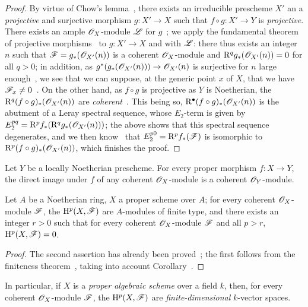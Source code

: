 \begin{proof}
By virtue of Chow's lemma~, there exists an irreducible prescheme $X'$ an a \emph{projective} and surjective morphism $g:X'\to X$ such that $f\circ g:X'\to Y$ is \emph{projective}.
There exists an ample $\mathscr{O}_X$-module $\mathscr{L}$ for $g$~; we apply the fundamental theorem of projective morphisms~ to $g:X'\to X$ and with $\mathscr{L}$: there thus exists an integer $n$ such that $\mathscr{F}=g_*(\mathscr{O}_{X'}(n))$ is a coherent $\mathscr{O}_X$-module and $\mathrm{R}^q g_*(\mathscr{O}_{X'}(n))=0$ for all $q>0$; in addition, as $g^*(g_*(\sh{O}_{X'}(n)))\to\sh{O}_{X'}(n)$ is surjective for $n$ large enough~, we see that we can suppose, at the generic point $x$ of $X$, that we have $\mathscr{F}_x\neq 0$~.
On the other hand, as $f\circ g$ is projective as $Y$ is Noetherian, the $\mathrm{R}^q(f\circ g)_*(\mathscr{O}_{X'}(n))$ are \emph{coherent}~.
This being so, $\mathrm{R}^\bullet(f\circ g)_*(\mathscr{O}_{X'}(n))$ is the abutment of a Leray spectral sequence, whose $E_2$-term is given by $E_2^{pq}=\mathrm{R}^p f_*(\mathrm{R}^q g_*(\mathscr{O}_{X'}(n)))$; the above shows that this spectral sequence degenerates, and we then know~ that $E_2^{p0}=\mathrm{R}^p f_*(\mathscr{F})$ is isomorphic to $\mathrm{R}^p(f\circ g)_*(\mathscr{O}_{X'}(n))$, which finishes the proof.
\end{proof}

\begin{corollary}[3.2.2]
\label{III.3.2.2}
Let $Y$ be a locally Noetherian prescheme.
For every proper morphism $f:X\to Y$, the direct image under $f$ of any coherent $\mathscr{O}_X$-module is a coherent $\mathscr{O}_Y$-module.
\end{corollary}

\begin{corollary}[3.2.3]
\label{III.3.2.3}
Let $A$ be a Noetherian ring, $X$ a proper scheme over $A$; for every coherent $\mathscr{O}_X$-module $\mathscr{F}$, the $\mathrm{H}^p(X,\mathscr{F})$ are $A$-modules of finite type, and there exists an integer $r>0$ such that for every coherent $\mathscr{O}_X$-module $\mathscr{F}$ and all $p>r$, $\mathrm{H}^p(X,\mathscr{F})=0$.
\end{corollary}

\begin{proof}
The second assertion has already been proved~; the first follows from the finiteness theorem~, taking into account Corollary~.
\end{proof}

In particular, if $X$ is a \emph{proper algebraic scheme} over a field $k$, then, for every coherent $\mathscr{O}_X$-module $\mathscr{F}$, the $\mathrm{H}^p(X,\mathscr{F})$ are \emph{finite-dimensional} $k$-vector spaces.


